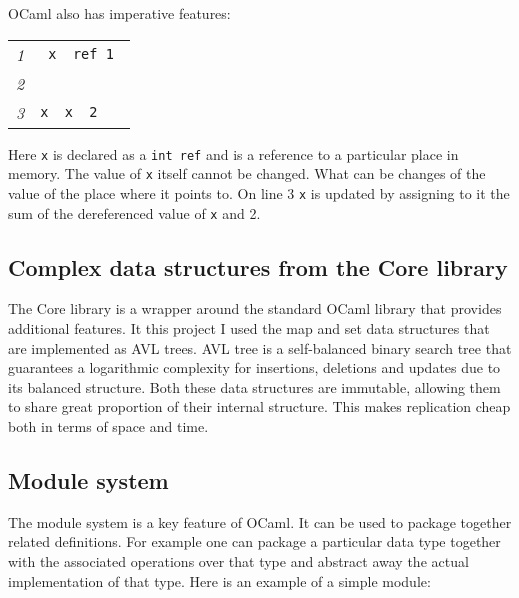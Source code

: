 \documentclass[12pt,twoside,notitlepage]{report}
\newcommand{\mlkeywordA}[1]{\mbox{\color{cyan}{\textbf{\texttt{#1}}}}}
\newcommand{\mlkeyword}[1]{\mbox{\color{red}{#1}}}
\newcommand{\mloperator}[1]{\mbox{\color{darkgreen}{#1}}}
\newcommand{\mlcodeline}[2]{\tiny\sl #1 & \begin{minipage}[c]{0.8\linewidth}\begin{alltt}\mbox{#2}\end{alltt}\end{minipage}\\}
\begin{document}
OCaml also has imperative features:



{\scriptsize\noindent\begin{longtable}{r|l}
\mlcodeline{1}{\mlkeywordA{let}~x~\mlkeyword{=}~ref~1
}
\mlcodeline{2}{
}
\mlcodeline{3}{x~\mloperator{\mbox{\COLON}{}=}~\mloperator{\mbox{}\hspace{0pt}{!}\hspace{0pt}}x~\mloperator{+}~2~
}
\end{longtable}
}

Here {\tt x} is declared as a {\tt int ref} and is a reference to a particular place in memory. The value of {\tt x} itself cannot be changed. What can be changes of the value of the place where it points to. On line 3 {\tt x} is updated by assigning to it the sum of the dereferenced value of {\tt x} and 2.  


\subsection{Complex data structures from the Core library}
The Core library is a wrapper around the standard OCaml library that provides additional features. It this project I used the map and set data structures that are implemented as AVL trees. AVL tree is a self-balanced binary search tree that guarantees a logarithmic complexity for insertions, deletions and updates due to its balanced structure. Both these data structures are immutable, allowing them to share great proportion of their internal structure. This makes replication cheap both in terms of space and time. 

\subsection{Module system}
The module system is a key feature of OCaml. It can be used to package together related definitions. For example one can package a particular data type together with the associated operations over that type and abstract away the actual implementation of that type. Here is an example of a simple module:

\end{document}
